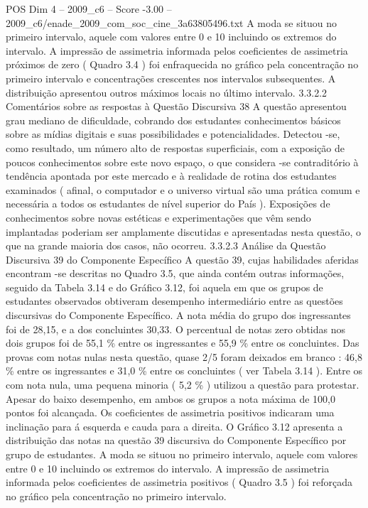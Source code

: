 \begin{textsample}{POS Dim 4 – 2009\_c6 – Score -3.00 – 2009\_c6/enade\_2009\_com\_soc\_cine\_3a63805496.txt}
A moda se situou no primeiro intervalo, aquele com valores entre 0 e 10 incluindo os extremos do intervalo.
A impressão de assimetria informada pelos coeficientes de assimetria próximos de zero ( Quadro 3.4 ) foi enfraquecida no gráfico pela concentração no primeiro intervalo e concentrações crescentes nos intervalos subsequentes.
A distribuição apresentou outros máximos locais no último intervalo. 3.3.2.2 Comentários sobre as respostas à Questão Discursiva 38 A questão apresentou grau mediano de dificuldade, cobrando dos estudantes conhecimentos básicos sobre as mídias digitais e suas possibilidades e potencialidades.
Detectou -se, como resultado, um número alto de respostas superficiais, com a exposição de poucos conhecimentos sobre este novo espaço, o que considera -se contraditório à tendência apontada por este mercado e à realidade de rotina dos estudantes examinados ( afinal, o computador e o universo virtual são uma prática comum e necessária a todos os estudantes de nível superior do País ).
Exposições de conhecimentos sobre novas estéticas e experimentações que vêm sendo implantadas poderiam ser amplamente discutidas e apresentadas nesta questão, o que na grande maioria dos casos, não ocorreu. 3.3.2.3 Análise da Questão Discursiva 39 do Componente Específico A questão 39, cujas habilidades aferidas encontram -se descritas no Quadro 3.5, que ainda contém outras informações, seguido da Tabela 3.14 e do Gráfico 3.12, foi aquela em que os grupos de estudantes observados obtiveram desempenho intermediário entre as questões discursivas do Componente Específico.
A nota média do grupo dos ingressantes foi de 28,15, e a dos concluintes 30,33.
O percentual de notas zero obtidas nos dois grupos foi de 55,1 \% entre os ingressantes e 55,9 \% entre os concluintes.
Das provas com notas nulas nesta questão, quase 2/5 foram deixados em branco : 46,8 \% entre os ingressantes e 31,0 \% entre os concluintes ( ver Tabela 3.14 ).
Entre os com nota nula, uma pequena minoria ( 5,2 \% ) utilizou a questão para protestar.
Apesar do baixo desempenho, em ambos os grupos a nota máxima de 100,0 pontos foi alcançada.
Os coeficientes de assimetria positivos indicaram uma inclinação para á esquerda e cauda para a direita.
O Gráfico 3.12 apresenta a distribuição das notas na questão 39 discursiva do Componente Específico por grupo de estudantes.
A moda se situou no primeiro intervalo, aquele com valores entre 0 e 10 incluindo os extremos do intervalo.
A impressão de assimetria informada pelos coeficientes de assimetria positivos ( Quadro 3.5 ) foi reforçada no gráfico pela concentração no primeiro intervalo.

\end{textsample}
